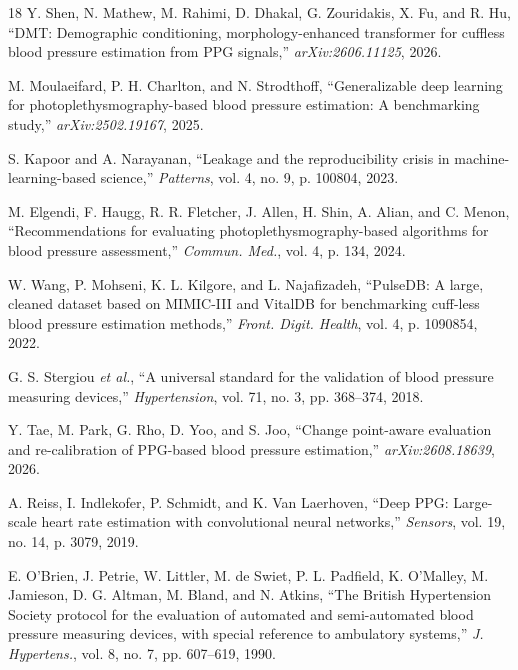 \documentclass[journal]{IEEEtran}
\begin{document}
\begin{thebibliography}{18}
 Y. Shen, N. Mathew, M. Rahimi, D. Dhakal, G. Zouridakis, X. Fu, and R. Hu, ``DMT: Demographic conditioning, morphology-enhanced transformer for cuffless blood pressure estimation from PPG signals,'' \textit{arXiv:2606.11125}, 2026.

 M. Moulaeifard, P. H. Charlton, and N. Strodthoff, ``Generalizable deep learning for photoplethysmography-based blood pressure estimation: A benchmarking study,'' \textit{arXiv:2502.19167}, 2025.

 S. Kapoor and A. Narayanan, ``Leakage and the reproducibility crisis in machine-learning-based science,'' \textit{Patterns}, vol. 4, no. 9, p. 100804, 2023.

 M. Elgendi, F. Haugg, R. R. Fletcher, J. Allen, H. Shin, A. Alian, and C. Menon, ``Recommendations for evaluating photoplethysmography-based algorithms for blood pressure assessment,'' \textit{Commun. Med.}, vol. 4, p. 134, 2024.

 W. Wang, P. Mohseni, K. L. Kilgore, and L. Najafizadeh, ``PulseDB: A large, cleaned dataset based on MIMIC-III and VitalDB for benchmarking cuff-less blood pressure estimation methods,'' \textit{Front. Digit. Health}, vol. 4, p. 1090854, 2022.

 G. S. Stergiou \textit{et al.}, ``A universal standard for the validation of blood pressure measuring devices,'' \textit{Hypertension}, vol. 71, no. 3, pp. 368--374, 2018.

 Y. Tae, M. Park, G. Rho, D. Yoo, and S. Joo, ``Change point-aware evaluation and re-calibration of PPG-based blood pressure estimation,'' \textit{arXiv:2608.18639}, 2026.

 A. Reiss, I. Indlekofer, P. Schmidt, and K. Van Laerhoven, ``Deep PPG: Large-scale heart rate estimation with convolutional neural networks,'' \textit{Sensors}, vol. 19, no. 14, p. 3079, 2019.

 E. O'Brien, J. Petrie, W. Littler, M. de Swiet, P. L. Padfield, K. O'Malley, M. Jamieson, D. G. Altman, M. Bland, and N. Atkins, ``The British Hypertension Society protocol for the evaluation of automated and semi-automated blood pressure measuring devices, with special reference to ambulatory systems,'' \textit{J. Hypertens.}, vol. 8, no. 7, pp. 607--619, 1990.

\end{thebibliography}
\end{document}
